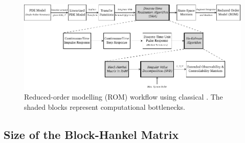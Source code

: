 \begin{figure}[!htbp]
    \centering
    \includegraphics[width=\textwidth]{traditional_dra.pdf}
    \caption[%
     workflow using classical .
    ]%
    {%
        Reduced-order modelling (ROM) workflow using classical
        . The shaded blocks represent computational bottlenecks.
    }%
    \label{fig:traditional_ROM_Workflow}
\end{figure}

\subsection{Size of the Block-Hankel Matrix}\label{sec:size-of-the}

